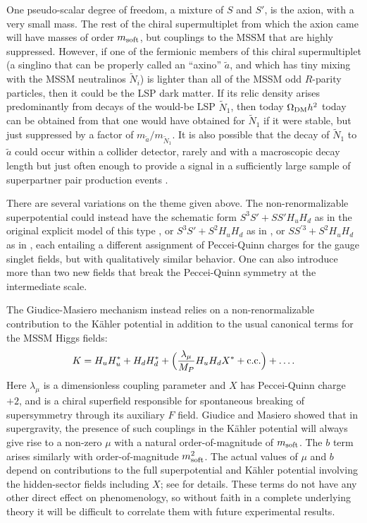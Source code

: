 \documentclass[11pt]{article}
\def\beq{\begin{eqnarray}}
\def\eeq{\end{eqnarray}}
\begin{document}
One pseudo-scalar degree of freedom, a mixture of $S$ and $S'$,
is the axion, with a very small mass. The rest of the chiral
supermultiplet from which the axion came will have masses of order
$m_{\rm soft}$, but couplings to the MSSM that are highly suppressed.
However, if one of the fermionic members of this chiral supermultiplet
(a singlino that can be properly called an ``axino'' $\tilde a$, and
which has tiny mixing with the MSSM neutralinos $\tilde N_i$) is lighter
than all of the MSSM odd $R$-parity particles,
then it could be the LSP dark matter. If its relic density 
arises predominantly from decays of the would-be LSP $\tilde N_1$, then today 
$\Omega_{\rm DM} h^2$ today can be obtained from that one would have obtained for $\tilde 
N_1$ if it were stable, but just
suppressed by a factor of $m_{\tilde a}/m_{\tilde N_1}$. It is
also possible that the decay of $\tilde N_1$ to $\tilde a$ could occur
within a collider detector, rarely and with a macroscopic decay length but
just often enough to provide a signal in a sufficiently large sample of
superpartner pair production events \cite{Martinaxinos}.

There are several variations on the theme given above.
The non-renormalizable superpotential could instead
have the schematic form
$S^3 S' + S S' H_u H_d$
as in the original explicit model of this type
\cite{MurayamaSuzukiYanagida}, or
$S^3 S' + S^2 H_u H_d$
as in \cite{ChoiChunKim},
or $S S^{\prime 3} + S^2 H_u H_d$ as in \cite{Martinaxinos},
each entailing a different assignment
of Peccei-Quinn charges for the gauge singlet fields, 
but with qualitatively similar behavior.
One can also introduce more than two new fields that break the
Peccei-Quinn symmetry at the intermediate scale.

The Giudice-Masiero mechanism instead relies on 
a non-renormalizable contribution to the
K\"ahler potential in addition to the usual 
canonical terms for the MSSM Higgs fields:
\beq
K = H_u H_u^* + H_d H_d^* + \Bigl (\frac{\lambda_\mu}{M_P} H_u H_d X^* +
{\rm c.c.} \Bigr ) + \ldots. \label{eq:KahlerpotentialforGiudiceMasiero}
\eeq
Here $\lambda_\mu$ is a dimensionless coupling parameter and 
$X$ has Peccei-Quinn charge $+2$, and is a chiral superfield responsible for
spontaneous breaking of supersymmetry through its auxiliary $F$ field.
Giudice and Masiero showed
\cite{GiudiceMasiero} that in supergravity, the presence of such
couplings in the K\"ahler potential
will always give rise to a non-zero $\mu$ with a natural
order-of-magnitude of $m_{\rm soft}$. The $b$ term arises
similarly with order-of-magnitude $m_{\rm soft}^2$. The actual values of
$\mu$ and $b$ depend on contributions to the full superpotential and K\"ahler potential
involving the hidden-sector fields including $X$; see
\cite{GiudiceMasiero} for details. These terms do
not have any other direct effect on phenomenology, so without faith in a
complete underlying theory it will be difficult to correlate them with future
experimental results.
\end{document}
